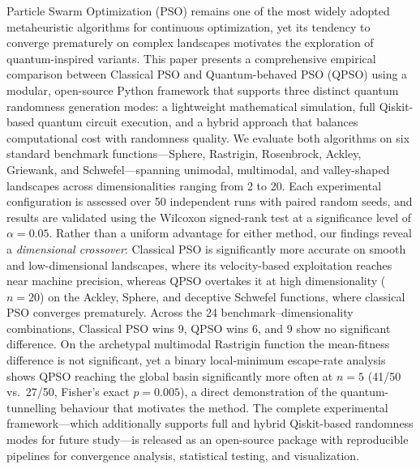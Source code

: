 Particle Swarm Optimization (PSO) remains one of the most widely adopted metaheuristic algorithms for continuous optimization, yet its tendency to converge prematurely on complex landscapes motivates the exploration of quantum-inspired variants. This paper presents a comprehensive empirical comparison between Classical PSO and Quantum-behaved PSO (QPSO) using a modular, open-source Python framework that supports three distinct quantum randomness generation modes: a lightweight mathematical simulation, full Qiskit-based quantum circuit execution, and a hybrid approach that balances computational cost with randomness quality. We evaluate both algorithms on six standard benchmark functions---Sphere, Rastrigin, Rosenbrock, Ackley, Griewank, and Schwefel---spanning unimodal, multimodal, and valley-shaped landscapes across dimensionalities ranging from 2 to 20. Each experimental configuration is assessed over 50 independent runs with paired random seeds, and results are validated using the Wilcoxon signed-rank test at a significance level of $\alpha = 0.05$. Rather than a uniform advantage for either method, our findings reveal a \emph{dimensional crossover}: Classical PSO is significantly more accurate on smooth and low-dimensional landscapes, where its velocity-based exploitation reaches near machine precision, whereas QPSO overtakes it at high dimensionality ($n = 20$) on the Ackley, Sphere, and deceptive Schwefel functions, where classical PSO converges prematurely. Across the 24 benchmark--dimensionality combinations, Classical PSO wins 9, QPSO wins 6, and 9 show no significant difference. On the archetypal multimodal Rastrigin function the mean-fitness difference is not significant, yet a binary local-minimum escape-rate analysis shows QPSO reaching the global basin significantly more often at $n = 5$ (41/50 vs.\ 27/50, Fisher's exact $p = 0.005$), a direct demonstration of the quantum-tunnelling behaviour that motivates the method. The complete experimental framework---which additionally supports full and hybrid Qiskit-based randomness modes for future study---is released as an open-source package with reproducible pipelines for convergence analysis, statistical testing, and visualization.
